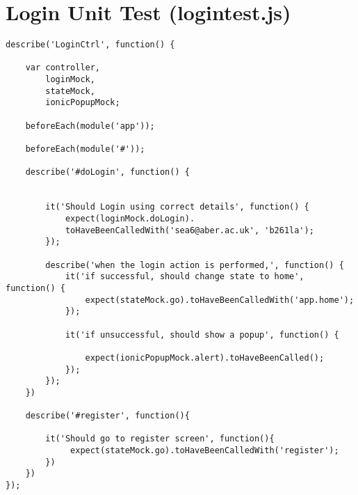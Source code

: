 \section{Login Unit Test (logintest.js)}
\begin{verbatim}
describe('LoginCtrl', function() {

    var controller, 
        loginMock,
        stateMock,
        ionicPopupMock;
    
    beforeEach(module('app'));

    beforeEach(module('#'));  

    describe('#doLogin', function() {


        it('Should Login using correct details', function() {
            expect(loginMock.doLogin).
            toHaveBeenCalledWith('sea6@aber.ac.uk', 'b261la'); 
        });

        describe('when the login action is performed,', function() {
            it('if successful, should change state to home', function() {
                expect(stateMock.go).toHaveBeenCalledWith('app.home');
            });

            it('if unsuccessful, should show a popup', function() {

                expect(ionicPopupMock.alert).toHaveBeenCalled();
            });
        });
    })

    describe('#register', function(){

        it('Should go to register screen', function(){
             expect(stateMock.go).toHaveBeenCalledWith('register');
        })
    })
});
\end{verbatim}

